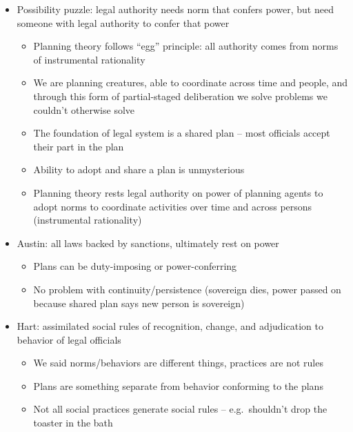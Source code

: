 \begin{itemize}
\tightlist
\item
  Possibility puzzle: legal authority needs norm that confers power, but
  need someone with legal authority to confer that power

  \begin{itemize}
  \tightlist
  \item
    Planning theory follows ``egg'' principle: all authority comes from
    norms of instrumental rationality
  \item
    We are planning creatures, able to coordinate across time and
    people, and through this form of partial-staged deliberation we
    solve problems we couldn't otherwise solve
  \item
    The foundation of legal system is a shared plan -- most officials
    accept their part in the plan
  \item
    Ability to adopt and share a plan is unmysterious
  \item
    Planning theory rests legal authority on power of planning agents to
    adopt norms to coordinate activities over time and across persons
    (instrumental rationality)
  \end{itemize}
\item
  Austin: all laws backed by sanctions, ultimately rest on power

  \begin{itemize}
  \tightlist
  \item
    Plans can be duty-imposing or power-conferring
  \item
    No problem with continuity/persistence (sovereign dies, power passed
    on because shared plan says new person is sovereign)
  \end{itemize}
\item
  Hart: assimilated social rules of recognition, change, and
  adjudication to behavior of legal officials

  \begin{itemize}
  \tightlist
  \item
    We said norms/behaviors are different things, practices are not
    rules
  \item
    Plans are something separate from behavior conforming to the plans
  \item
    Not all social practices generate social rules -- e.g.~shouldn't
    drop the toaster in the bath


\end{itemize}
\end{itemize}
